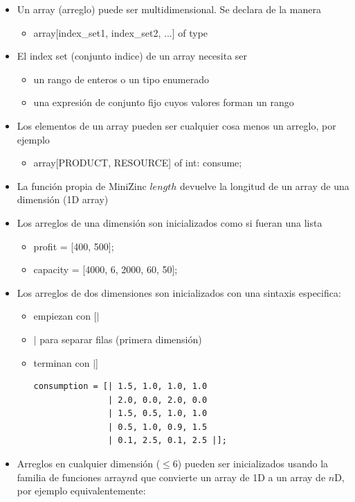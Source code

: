 \documentclass[12pt]{article}
\begin{document}
\begin{itemize}
\item Un array (arreglo) puede ser multidimensional. Se declara de la manera
\begin{itemize}
\item array[index\_set1, index\_set2, ...] of type
\end{itemize}
\item El index set (conjunto indice) de un array necesita ser
\begin{itemize}
\item un rango de enteros o un tipo enumerado
\item una expresión de conjunto fijo cuyos valores forman un rango
\end{itemize}
\item Los elementos de un array pueden ser cualquier cosa menos un arreglo, por ejemplo
\begin{itemize}
\item array[PRODUCT, RESOURCE] of int: consume;
\end{itemize}
\item La función propia de MiniZinc $length$ devuelve la longitud de un array de una dimensión (1D array)
\item Los arreglos de una dimensión son inicializados como si fueran una lista
\begin{itemize}
\item profit = [400, 500];
\item capacity = [4000, 6, 2000, 60, 50];
\end{itemize}
\item Los arreglos de dos dimensiones son inicializados con una sintaxis especifica:
\begin{itemize}
\item empiezan con [$\mid$
\item $\mid$ para separar filas (primera dimensión)
\item terminan con $\mid$]
\begin{Verbatim}
consumption = [| 1.5, 1.0, 1.0, 1.0
               | 2.0, 0.0, 2.0, 0.0
               | 1.5, 0.5, 1.0, 1.0
               | 0.5, 1.0, 0.9, 1.5
               | 0.1, 2.5, 0.1, 2.5 |];
\end{Verbatim}
\end{itemize}
\end{itemize}

\newpage

\begin{itemize}
\item Arreglos en cualquier dimensión ($\leq 6$) pueden ser inicializados usando la familia de funciones array$n$d que convierte un array de 1D a un array de $n$D, por ejemplo equivalentemente: 
\end{itemize}
\end{document}
